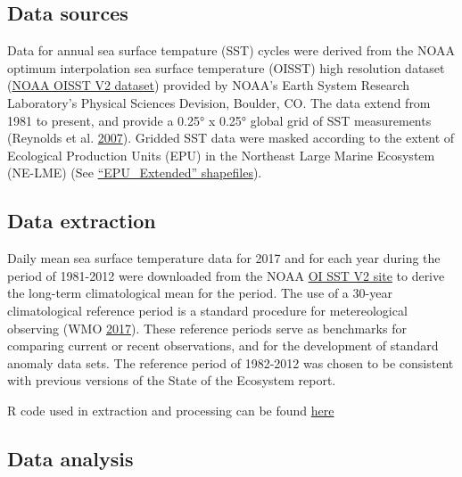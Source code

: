 \documentclass[
]{book}
\begin{document}
\hypertarget{data-sources-1}{%
\subsection{Data sources}\label{data-sources-1}}

Data for annual sea surface tempature (SST) cycles were derived from the NOAA optimum interpolation sea surface temperature (OISST) high resolution dataset (\href{https://www.esrl.noaa.gov/psd/data/gridded/data.noaa.oisst.v2.highres.html}{NOAA OISST V2 dataset}) provided by NOAA's Earth System Research Laboratory's Physical Sciences Devision, Boulder, CO. The data extend from 1981 to present, and provide a 0.25° x 0.25° global grid of SST measurements (Reynolds et al. \protect\hyperlink{ref-Reynolds2007}{2007}). Gridded SST data were masked according to the extent of Ecological Production Units (EPU) in the Northeast Large Marine Ecosystem (NE-LME) (See \href{https://github.com/NOAA-EDAB/tech-doc/tree/master/gis}{``EPU\_Extended'' shapefiles}).

\hypertarget{data-extraction-1}{%
\subsection{Data extraction}\label{data-extraction-1}}

Daily mean sea surface temperature data for 2017 and for each year during the period of 1981-2012 were downloaded from the NOAA \href{https://www.esrl.noaa.gov/psd/data/gridded/data.noaa.oisst.v2.highres.html}{OI SST V2 site} to derive the long-term climatological mean for the period. The use of a 30-year climatological reference period is a standard procedure for metereological observing (WMO \protect\hyperlink{ref-WMO2017}{2017}). These reference periods serve as benchmarks for comparing current or recent observations, and for the development of standard anomaly data sets. The reference period of 1982-2012 was chosen to be consistent with previous versions of the State of the Ecosystem report.

R code used in extraction and processing can be found \href{https://github.com/NOAA-EDAB/tech-doc/blob/master/R/stored_scripts/annual_sst_cycles_extraction_and_processing.R}{here}

\hypertarget{data-analysis}{%
\subsection{Data analysis}\label{data-analysis}}
\end{document}
